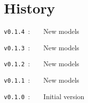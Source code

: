 \documentclass{article}
\begin{document}
\begin{PresentationCode}{}
\end{PresentationCode}

\begin{PresentationCode}{}
\end{PresentationCode}

\begin{PresentationCode}{}
\end{PresentationCode}

\begin{PresentationCode}{}
\end{PresentationCode}

\begin{PresentationCode}{}
\end{PresentationCode}

\newpage

\part{History}

\verb|v0.1.4|~:~~~~New models

\verb|v0.1.3|~:~~~~New models

\verb|v0.1.2|~:~~~~New models

\verb|v0.1.1|~:~~~~New models

\verb|v0.1.0|~:~~~~Initial version
\end{document}
